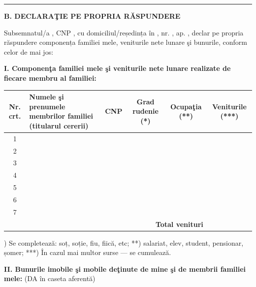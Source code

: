 \documentclass[11pt,a4paper]{article}
\newcommand{\fillline}[1][6cm]{\underline{\hspace{#1}}}
\begin{document}
\vspace{0.3cm}
\hrule
\vspace{0.5cm}

\begin{center}
\textbf{B. DECLARAŢIE PE PROPRIA RĂSPUNDERE}
\end{center}

\vspace{0.4cm}

Subsemnatul/a \fillline[7cm], CNP \fillline[5cm], cu domiciliul/reședința în \fillline[5cm], nr. \fillline[1.5cm], ap. \fillline[1.5cm], declar pe propria răspundere componența familiei mele, veniturile nete lunare şi bunurile, conform celor de mai jos:

\vspace{0.4cm}

\textbf{I. Componenţa familiei mele şi veniturile nete lunare realizate de fiecare membru al familiei:}

\vspace{0.2cm}

\begin{tabularx}{\textwidth}{|c|X|c|c|c|c|}
\hline
\textbf{Nr. crt.} & \textbf{Numele şi prenumele membrilor familiei} (titularul cererii) & \textbf{CNP} & \textbf{Grad rudenie (*)} & \textbf{Ocupaţia (**)} & \textbf{Veniturile (***)} \\
\hline
1 & & & & & \\
\hline
2 & & & & & \\
\hline
3 & & & & & \\
\hline
4 & & & & & \\
\hline
5 & & & & & \\
\hline
6 & & & & & \\
\hline
7 & & & & & \\
\hline
\multicolumn{5}{|r|}{\textbf{Total venituri}} & \\
\hline
\end{tabularx}

\vspace{0.2cm}

{\footnotesize *) Se completează: soț, soție, fiu, fiică, etc; **) salariat, elev, student, pensionar, șomer; ***) În cazul mai multor surse — se cumulează.}

\vspace{0.4cm}

\textbf{II. Bunurile imobile şi mobile deţinute de mine şi de membrii familiei mele:} (DA în caseta aferentă)

\vspace{0.2cm}
\end{document}
